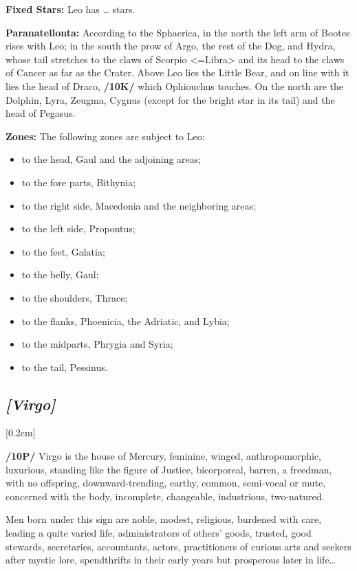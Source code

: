 \textbf{Fixed Stars:} Leo has … stars. 

\textbf{Paranatellonta:} According to the Sphaerica, in the north the left arm of Bootes rises with Leo; in the south the prow of Argo, the rest of the Dog, and Hydra, whose tail stretches to the claws of Scorpio <=Libra> and its head to the claws of Cancer as far as the Crater. Above Leo lies the Little Bear, and on line with it lies the head of Draco, \textbf{/10K/} which Ophiouchus touches. On the north are the Dolphin, Lyra, Zeugma, Cygnus (except for the bright star in its tail) and the head of Pegasus.

\textbf{Zones: } The following zones are subject to Leo: 
\begin{itemize}
\item to the head, Gaul and the adjoining areas; 
\item to the fore parts, Bithynia; 
\item to the right side, Macedonia and the neighboring areas; \item to the left side, Propontus; 
\item to the feet, Galatia; 
\item to the belly, Gaul; 
\item to the shoulders, Thrace; 
\item to the flanks, Phoenicia, the Adriatic, and Lybia; 
\item to the midparts, Phrygia and Syria; 
\item to the tail, Pessinus.
\end{itemize}

\secbr
\subsection{\textit{[Virgo]}}
[0.2cm]

\textbf{/10P/}  Virgo is the house of Mercury,  feminine, winged, anthropomorphic, luxurious, standing like the figure of Justice,  bicorporeal, barren, a freedman, with no offspring, downward-trending,  earthy,  common,  semi-vocal or  mute, concerned with the body, incomplete, changeable, industrious,  two-natured. 

Men born under this sign are noble, modest, religious, burdened with care, leading a quite varied life, administrators of others’ goods, trusted, good stewards, secretaries, accountants, actors, practitioners of curious arts and seekers after mystic lore, spendthrifts in their early years but prosperous later in life\ldots 

